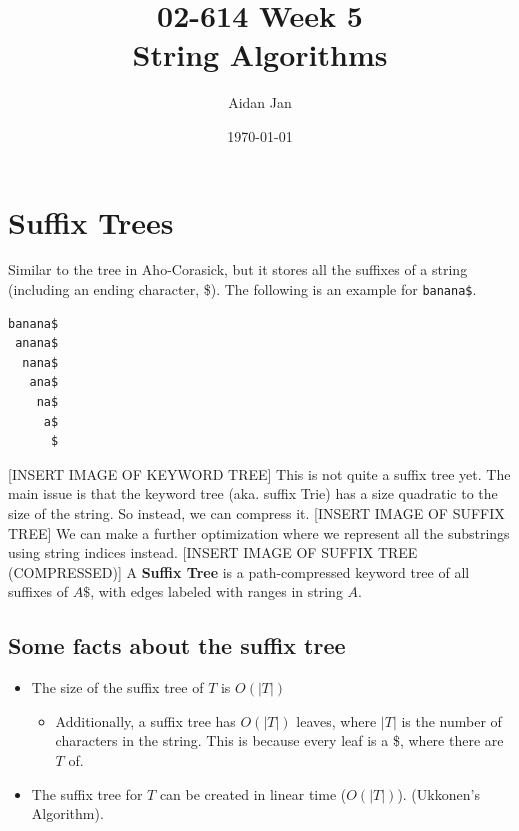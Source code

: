 \documentclass[10pt]{article}
\title{02-614 Week 5 \\ \large{String Algorithms}}
\author{Aidan Jan}
\date{\today}
\begin{document}
\maketitle

\section*{Suffix Trees}
Similar to the tree in Aho-Corasick, but it stores all the suffixes of a string (including an ending character, \$).  The following is an example for \texttt{banana\$}.
\begin{verbatim}
banana$
 anana$
  nana$
   ana$
    na$
     a$
      $
\end{verbatim}
[INSERT IMAGE OF KEYWORD TREE]
This is not quite a suffix tree yet.  The main issue is that the keyword tree (aka. suffix Trie) has a size quadratic to the size of the string.  So instead, we can compress it.
[INSERT IMAGE OF SUFFIX TREE]
We can make a further optimization where we represent all the substrings using string indices instead.
[INSERT IMAGE OF SUFFIX TREE (COMPRESSED)]
A \textbf{Suffix Tree} is a path-compressed keyword tree of all suffixes of $A\$$, with edges labeled with ranges in string $A$.

\subsection*{Some facts about the suffix tree}
\begin{itemize}
	\item The size of the suffix tree of $T$ is $O(|T|)$
    \begin{itemize}
	    \item Additionally, a suffix tree has $O(|T|)$ leaves, where $|T|$ is the number of characters in the string.  This is because every leaf is a \$, where there are $T$ of.
    \end{itemize}
	\item The suffix tree for $T$ can be created in linear time ($O(|T|)$).  (Ukkonen's Algorithm).
\end{itemize}
\end{document}
